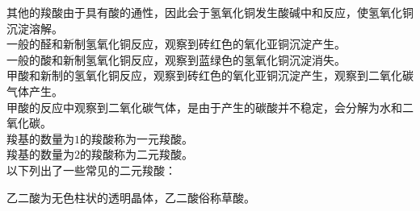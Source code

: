 \documentclass[UTF8]{ctexart}
\begin{document}
    其他的羧酸由于具有酸的通性，因此会于氢氧化铜发生酸碱中和反应，使氢氧化铜沉淀溶解。\\[3mm]
    一般的醛和新制氢氧化铜反应，观察到砖红色的氧化亚铜沉淀产生。\\[3mm]
    一般的酸和新制氢氧化铜反应，观察到蓝绿色的氢氧化铜沉淀消失。\\[3mm]
    甲酸和新制的氢氧化铜反应，观察到砖红色的氧化亚铜沉淀产生，观察到二氧化碳气体产生。\\[3mm]
    甲酸的反应中观察到二氧化碳气体，是由于产生的碳酸并不稳定，会分解为水和二氧化碳。\\[10mm]
    羧基的数量为$1$的羧酸称为一元羧酸。\\[3mm]
    羧基的数量为$2$的羧酸称为二元羧酸。\\[3mm]
    以下列出了一些常见的二元羧酸：\vspace{8pt}
    \begin{center}
        \qquad\quad
    \end{center}\vspace{10pt}
    乙二酸为无色柱状的透明晶体，乙二酸俗称草酸。

\newpage
\end{document}
